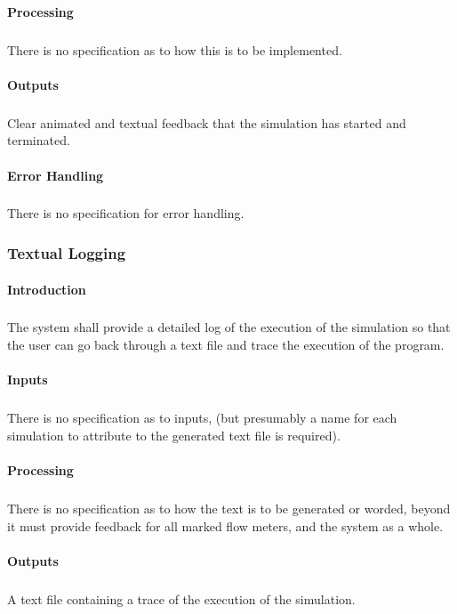 \documentclass{scrartcl}
\begin{document}
\paragraph{Processing}
\subparagraph{}
There is no specification as to how this is to be implemented.

\paragraph{Outputs}
\subparagraph{}
Clear animated and textual feedback that the simulation has started and terminated.

\paragraph{Error Handling}
\subparagraph{}
There is no specification for error handling.



\subsubsection{Textual Logging}
\paragraph{Introduction}
\subparagraph{}
The system shall provide a detailed log of the execution of the simulation so that the user can go back through a text file and trace the execution of the program.

\paragraph{Inputs}
\subparagraph{}
There is no specification as to inputs, (but presumably a name for each simulation to attribute to the generated text file is required).

\paragraph{Processing}
\subparagraph{}
There is no specification as to how the text is to be generated or worded, beyond it must provide feedback for all marked flow meters, and the system as a whole.

\paragraph{Outputs}
\subparagraph{}
A text file containing a trace of the execution of the simulation.
\end{document}
